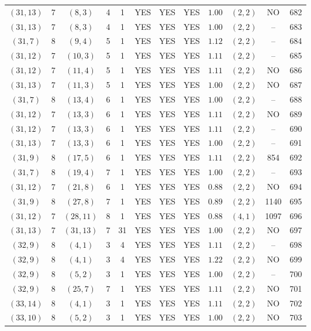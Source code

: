 \begin{longtable}{|c|c|c|c|c|c|c|c|c|c|c|c|}
$(31,13)$ & 7 & $(8,3)$ & 4 & 1 & YES & YES & YES & $1.00$ & $(2,2)$ & NO & 682\\
$(31,13)$ & 7 & $(8,3)$ & 4 & 1 & YES & YES & YES & $1.00$ & $(2,2)$ & -- & 683\\
$(31,7)$ & 8 & $(9,4)$ & 5 & 1 & YES & YES & YES & $1.12$ & $(2,2)$ & -- & 684\\
$(31,12)$ & 7 & $(10,3)$ & 5 & 1 & YES & YES & YES & $1.11$ & $(2,2)$ & -- & 685\\
$(31,12)$ & 7 & $(11,4)$ & 5 & 1 & YES & YES & YES & $1.11$ & $(2,2)$ & NO & 686\\
$(31,13)$ & 7 & $(11,3)$ & 5 & 1 & YES & YES & YES & $1.00$ & $(2,2)$ & NO & 687\\
$(31,7)$ & 8 & $(13,4)$ & 6 & 1 & YES & YES & YES & $1.00$ & $(2,2)$ & -- & 688\\
$(31,12)$ & 7 & $(13,3)$ & 6 & 1 & YES & YES & YES & $1.11$ & $(2,2)$ & NO & 689\\
$(31,12)$ & 7 & $(13,3)$ & 6 & 1 & YES & YES & YES & $1.11$ & $(2,2)$ & -- & 690\\
$(31,13)$ & 7 & $(13,3)$ & 6 & 1 & YES & YES & YES & $1.00$ & $(2,2)$ & -- & 691\\
$(31,9)$ & 8 & $(17,5)$ & 6 & 1 & YES & YES & YES & $1.11$ & $(2,2)$ & 854 & 692\\
$(31,7)$ & 8 & $(19,4)$ & 7 & 1 & YES & YES & YES & $1.00$ & $(2,2)$ & -- & 693\\
$(31,12)$ & 7 & $(21,8)$ & 6 & 1 & YES & YES & YES & $0.88$ & $(2,2)$ & NO & 694\\
$(31,9)$ & 8 & $(27,8)$ & 7 & 1 & YES & YES & YES & $0.89$ & $(2,2)$ & 1140 & 695\\
$(31,12)$ & 7 & $(28,11)$ & 8 & 1 & YES & YES & YES & $0.88$ & $(4,1)$ & 1097 & 696\\
$(31,13)$ & 7 & $(31,13)$ & 7 & 31 & YES & YES & YES & $1.00$ & $(2,2)$ & NO & 697\\
$(32,9)$ & 8 & $(4,1)$ & 3 & 4 & YES & YES & YES & $1.11$ & $(2,2)$ & -- & 698\\
$(32,9)$ & 8 & $(4,1)$ & 3 & 4 & YES & YES & YES & $1.22$ & $(2,2)$ & NO & 699\\
$(32,9)$ & 8 & $(5,2)$ & 3 & 1 & YES & YES & YES & $1.00$ & $(2,2)$ & -- & 700\\
$(32,9)$ & 8 & $(25,7)$ & 7 & 1 & YES & YES & YES & $1.11$ & $(2,2)$ & NO & 701\\
$(33,14)$ & 8 & $(4,1)$ & 3 & 1 & YES & YES & YES & $1.11$ & $(2,2)$ & NO & 702\\
$(33,10)$ & 8 & $(5,2)$ & 3 & 1 & YES & YES & YES & $1.00$ & $(2,2)$ & NO & 703\\

\end{longtable}
